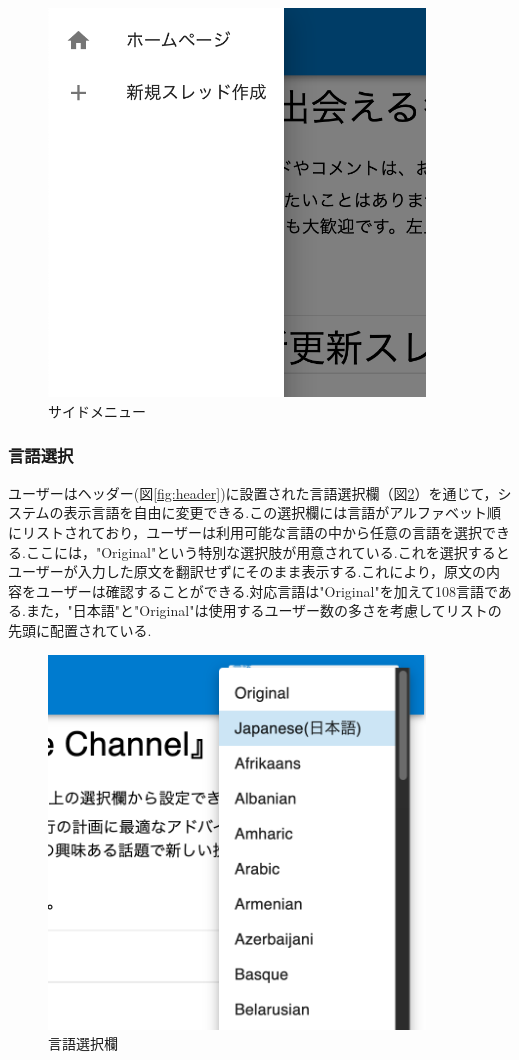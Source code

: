 \documentclass[b5paper,12pt,dvipdfmx]{jsreport}
\begin{document}
\begin{figure}[H]
	\centering
    \includegraphics[width=100mm,height=103.02mm]{./img/feature/side_menu.png}
	\caption{サイドメニュー}
	\label{fig:side_menu}
\end{figure}


\subsubsection{言語選択}
ユーザーはヘッダー(図\ref{fig:header})に設置された言語選択欄（図\ref{fig:language_select}）を通じて，システムの表示言語を自由に変更できる.この選択欄には言語がアルファベット順にリストされており，ユーザーは利用可能な言語の中から任意の言語を選択できる.ここには，"Original"という特別な選択肢が用意されている.これを選択するとユーザーが入力した原文を翻訳せずにそのまま表示する.これにより，原文の内容をユーザーは確認することができる.対応言語は"Original"を加えて108言語である.また，"日本語"と"Original"は使用するユーザー数の多さを考慮してリストの先頭に配置されている.

\begin{figure}[H]
	\centering
    \includegraphics[width=100mm,height=99.22mm]{./img/feature/language_select.png}
	\caption{言語選択欄}
	\label{fig:language_select}
\end{figure}
\end{document}
